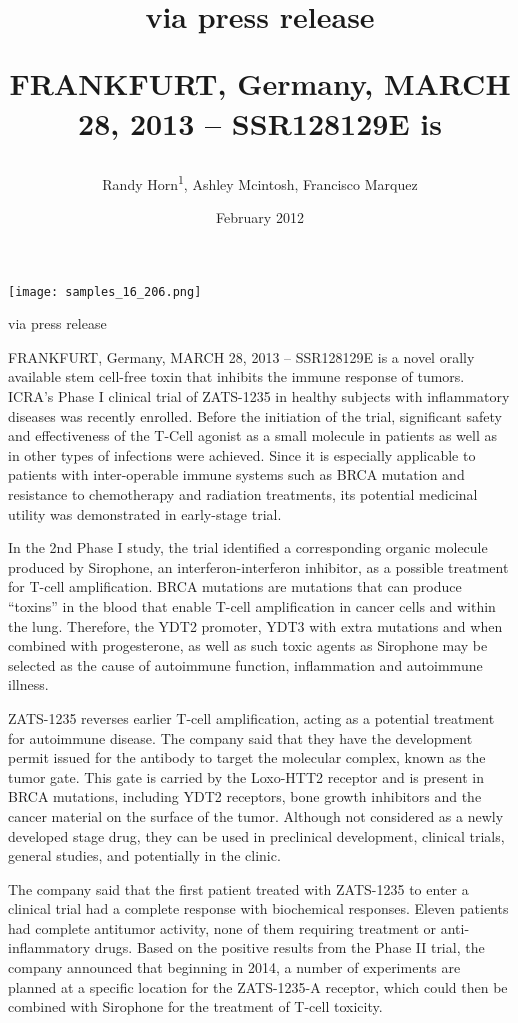 \documentclass{article}
\title{via press release

FRANKFURT, Germany, MARCH 28, 2013 – SSR128129E is}
\author{Randy Horn\textsuperscript{1},  Ashley Mcintosh,  Francisco Marquez}
\affil{\textsuperscript{1}American University of Beirut}
\date{February 2012}
\begin{document}
\maketitle

\begin{center}
\begin{minipage}{0.75\linewidth}
\texttt{[image: samples\_16\_206.png]}
\end{minipage}
\end{center}

via press release

FRANKFURT, Germany, MARCH 28, 2013 – SSR128129E is a novel orally available stem cell-free toxin that inhibits the immune response of tumors. ICRA’s Phase I clinical trial of ZATS-1235 in healthy subjects with inflammatory diseases was recently enrolled. Before the initiation of the trial, significant safety and effectiveness of the T-Cell agonist as a small molecule in patients as well as in other types of infections were achieved. Since it is especially applicable to patients with inter-operable immune systems such as BRCA mutation and resistance to chemotherapy and radiation treatments, its potential medicinal utility was demonstrated in early-stage trial.

In the 2nd Phase I study, the trial identified a corresponding organic molecule produced by Sirophone, an interferon-interferon inhibitor, as a possible treatment for T-cell amplification. BRCA mutations are mutations that can produce “toxins” in the blood that enable T-cell amplification in cancer cells and within the lung. Therefore, the YDT2 promoter, YDT3 with extra mutations and when combined with progesterone, as well as such toxic agents as Sirophone may be selected as the cause of autoimmune function, inflammation and autoimmune illness.

ZATS-1235 reverses earlier T-cell amplification, acting as a potential treatment for autoimmune disease. The company said that they have the development permit issued for the antibody to target the molecular complex, known as the tumor gate. This gate is carried by the Loxo-HTT2 receptor and is present in BRCA mutations, including YDT2 receptors, bone growth inhibitors and the cancer material on the surface of the tumor. Although not considered as a newly developed stage drug, they can be used in preclinical development, clinical trials, general studies, and potentially in the clinic.

The company said that the first patient treated with ZATS-1235 to enter a clinical trial had a complete response with biochemical responses. Eleven patients had complete antitumor activity, none of them requiring treatment or anti-inflammatory drugs. Based on the positive results from the Phase II trial, the company announced that beginning in 2014, a number of experiments are planned at a specific location for the ZATS-1235-A receptor, which could then be combined with Sirophone for the treatment of T-cell toxicity.
\end{document}
